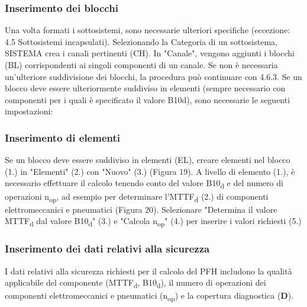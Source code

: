 \documentclass[a4paper,11pt]{article}
\begin{document}
    \subsubsection{Inserimento dei blocchi}
    Una volta formati i sottosistemi, sono necessarie ulteriori specifiche (eccezione: 4.5 Sottosistemi incapsulati). Selezionando la Categoria di un sottosistema, SISTEMA crea i canali pertinenti (CH). In "Canale", vengono aggiunti i blocchi (BL) corrispondenti ai singoli componenti di un canale. Se non è necessaria un'ulteriore suddivisione dei blocchi, la procedura può continuare con 4.6.3. Se un blocco deve essere ulteriormente suddiviso in elementi (sempre necessario con componenti per i quali è specificato il valore B10d), sono necessarie le seguenti impostazioni:

    \subsubsection{Inserimento di elementi}
    Se un blocco deve essere suddiviso in elementi (EL), creare elementi nel blocco (1.) in "Elementi" (2.) con "Nuovo" (3.) (Figura 19).
    A livello di elemento (1.), è necessario effettuare il calcolo tenendo conto del valore B10\textsubscript{d} e del numero di operazioni n\textsubscript{op}, ad esempio per determinare l'MTTF\textsubscript{d} (2.) di componenti elettromeccanici e pneumatici (Figura 20). Selezionare "Determina il valore MTTF\textsubscript{d} dal valore B10\textsubscript{d}" (3.) e "Calcola n\textsubscript{op}" (4.) per inserire i valori richiesti (5.)
    
    \subsubsection{Inserimento dei dati relativi alla sicurezza}
    I dati relativi alla sicurezza richiesti per il calcolo del PFH includono la qualità applicabile del componente (MTTF\textsubscript{d}, B10\textsubscript{d}), il numero di operazioni dei componenti elettromeccanici e pneumatici (n\textsubscript{op}) e la copertura diagnostica (\textbf{D}).
    
\end{document}
